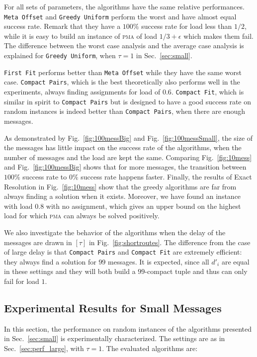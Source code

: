 \documentclass[a4paper,UKenglish,cleveref, autoref, thm-restate]{lipics-v2019}
\newcommand\pma{\textsc{pma}\xspace}
\newcommand\firstfit{\texttt{First Fit}\xspace}
\newcommand\compactpair{\texttt{Compact Pairs}\xspace}
\newcommand\metaoffset{\texttt{Meta Offset}\xspace}
\newcommand\greedyuniform{\texttt{Greedy Uniform}\xspace}
\newcommand\compactfit{\texttt{Compact Fit}\xspace}
\begin{document}
\medskip

For all sets of parameters, the algorithms have the same relative performances. \metaoffset and \greedyuniform
perform the worst and have almost equal success rate. Remark that they have a $100\%$ success rate for load
less than $1/2$, while it is easy to build an instance of \pma of load $1/3 +\epsilon$ which makes them fail. 
The difference between the worst case analysis and the average case analysis is explained for \greedyuniform, when $\tau = 1$ in Sec.~\ref{sec:small}.

\firstfit performs better than \metaoffset while they have the same worst case. \compactpair, which is the best theoretically also performs well in the experiments, always finding assignments for load of 
$0.6$.  \compactfit, which is similar in spirit to \compactpair but is designed to have a good success rate on random instances is indeed better than \compactpair, when there are enough messages.

As demonstrated by Fig.~\ref{fig:100messBig} and Fig.~\ref{fig:100messSmall}, the size of the messages has little impact on the success rate of the algorithms, when the number of messages and the load are kept the same. Comparing Fig.~\ref{fig:10mess} and Fig.~\ref{fig:100messBig} shows that for more messages, the transition between $100\%$ success rate to $0\%$ success rate happens faster.
Finally, the results of Exact Resolution in Fig.~\ref{fig:10mess} show that the greedy algorithms are far from always finding a solution when it exists. Moreover, we have found an instance with load $0.8$ with no assignment, which gives an upper bound on the highest load for which \pma can always be solved positively.

We also investigate the behavior of the algorithms when the delay of the messages are drawn in $[\tau]$ in Fig.~\ref{fig:shortroutes}. The difference from the case of large delay is that \compactpair and \compactfit are extremely efficient: they always find a solution for $99$ messages. It is expected, since all $d'_i$ are equal in these settings and 
they will both build a $99$-compact tuple and thus can only fail for load $1$.

\subsection{Experimental Results for Small Messages} \label{sec:perf_small}


In this section, the performance on random instances of the algorithms presented in Sec.~\ref{sec:small} is experimentally characterized. The settings are as in Sec.~\ref{sec:perf_large}, with $\tau = 1$. The evaluated algorithms are:
\end{document}
